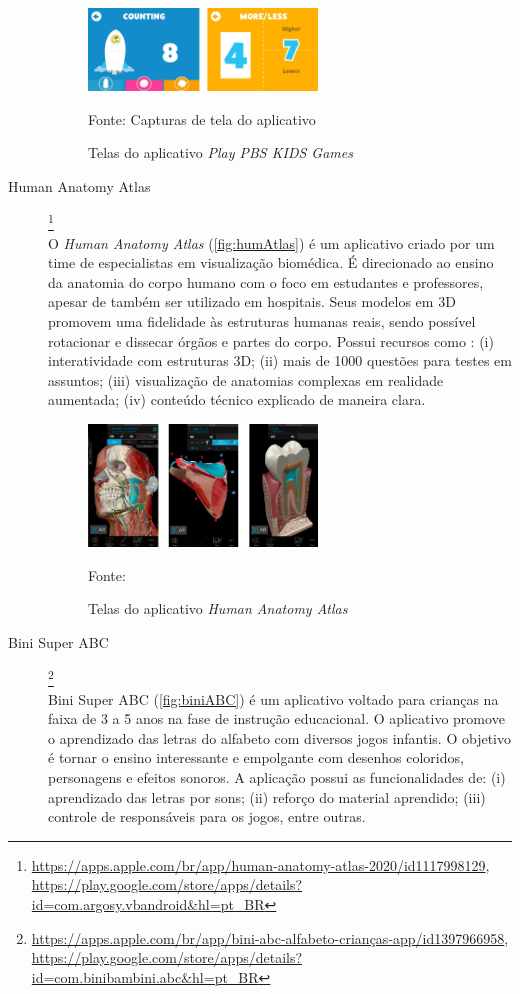 \begin{description}
\begin{figure}[H]
\centering
    \caption{Telas do aplicativo \textit{Play PBS KIDS Games}}
    \label{fig:pbs}
    \includegraphics[width=0.6\textwidth]{Figuras/pbsKids.jpg}
    
    Fonte: Capturas de tela do aplicativo
\end{figure}

\item[Human Anatomy Atlas]\footnote{\url{https://apps.apple.com/br/app/human-anatomy-atlas-2020/id1117998129}, \url{https://play.google.com/store/apps/details?id=com.argosy.vbandroid&hl=pt_BR}} \hfill \\
O \textit{Human Anatomy Atlas} (\autoref{fig:humAtlas}) é um aplicativo criado por um time de especialistas em visualização biomédica. É direcionado ao ensino da anatomia do corpo humano com o foco em estudantes e professores, apesar de também ser utilizado em hospitais. Seus modelos em 3D promovem uma fidelidade às estruturas humanas reais, sendo possível rotacionar e dissecar órgãos e partes do corpo. Possui recursos como : (i) interatividade com estruturas 3D; (ii) mais de 1000 questões para testes em assuntos; (iii) visualização de anatomias complexas em realidade aumentada; (iv) conteúdo técnico explicado de maneira clara.

\begin{figure}[ht!]
\centering
    \caption{Telas do aplicativo \textit{Human Anatomy Atlas}}
    \label{fig:humAtlas}
    \includegraphics[width=0.6\textwidth]{Figuras/humanAtlas.png}
    
    Fonte: \cite{HumanAnatomyAtlas}
\end{figure}

\item[Bini Super ABC]\footnote{\url{https://apps.apple.com/br/app/bini-abc-alfabeto-crianças-app/id1397966958}, \url{https://play.google.com/store/apps/details?id=com.binibambini.abc&hl=pt_BR}} \hfill \\
Bini Super ABC (\autoref{fig:biniABC}) é um aplicativo voltado para crianças na faixa de 3 a 5 anos na fase de instrução educacional. O aplicativo promove o aprendizado das letras do alfabeto com diversos jogos infantis. O objetivo é tornar o ensino interessante e empolgante com desenhos coloridos, personagens e efeitos sonoros. A aplicação possui as funcionalidades de: (i) aprendizado das letras por sons; (ii) reforço do material aprendido; (iii) controle de responsáveis para os jogos, entre outras.


\end{description}
